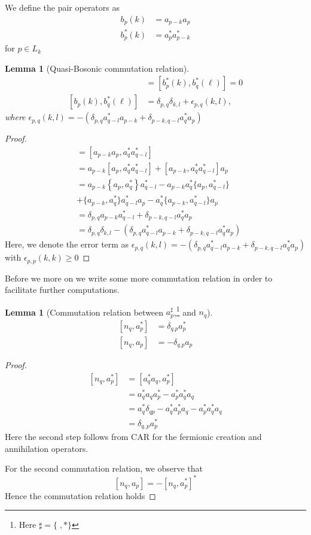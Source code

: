 \documentclass[sn-mathphys,Numbered, a4paper ,nocrop]{sn-jnl}%
\newcommand{\com}[1]{\left[ #1 \right]}
\theoremstyle{plain}
\newtheorem{lemma}[theorem]{Lemma}
\theoremstyle{definition}
\theoremstyle{remark}
\theoremstyle{plain}
\theoremstyle{definition}
\theoremstyle{remark}
\begin{document}
We define the pair operators as
\begin{align}
    b_p(k) &= a_{p-k}a_{p}\\
    b^*_p(k) &= a^*_{p}a^*_{p-k}
\end{align}
for $p\in L_k$
\begin{lemma}[Quasi-Bosonic commutation relation]
   \begin{align}
       [b_{p}(k),b_{q}(\ell)] &= [b^*_{p}(k),b^*_{q}(\ell)] = 0\\
       [b_{p}(k),b^*_{q}(\ell)] &= \delta_{p,q}\delta_{k,l} + \epsilon_{p,q}(k,l),
   \end{align} where $\epsilon_{p,q}(k,l) = -\left(\delta_{p,q}a^*_{q-l}a_{p-k} + \delta_{p-k,q-l}a^*_{q}a_{p}\right)$ 
    \end{lemma}
\begin{proof}
    \begin{align}
        [b_{p}(k),b^*_{q}(\ell)] &= [a_{p-k}a_{p},a^*_{q}a^*_{q-l}]\\
        &= a_{p-k}[a_p,a^*_{q}a^*_{q-l}] + [a_{p-k},a^*_{q}a^*_{q-l}]a_{p}\\
        &= a_{p-k}\left\{a_p,a^*_{q}\right\}a^*_{q-l} - a_{p-k}a^*_{q}\{a_{p},a^*_{q-l}\}\nonumber \\ &+ \{a_{p-k},a^*_q\}a^*_{q-l}a_{p} - a^*_{q}\{a_{p-k},a^*_{q-l}\}a_{p}\\
        &=\delta_{p,q}a_{p-k}a^*_{q-l} + \delta_{p-k,q-l}a^*_{q}a_{p}\\
        &= \delta_{p,q}\delta_{k,l}-\left(\delta_{p,q}a^*_{q-l}a_{p-k} + \delta_{p-k,q-l}a^*_{q}a_{p}\right)
    \end{align}
Here, we denote the error term as $\epsilon_{p,q}(k,l) = -\left(\delta_{p,q}a^*_{q-l}a_{p-k} + \delta_{p-k,q-l}a^*_{q}a_{p}\right)$ with $\epsilon_{p,p}(k,k)\geq 0$
\end{proof}
Before we more on we write some more commutation relation in order to facilitate further computations.
\begin{lemma}[Commutation relation between $a^\sharp_p$,\footnote{Here $\sharp = \{\;,*\} $} and $n_q$]
    \begin{align}
        \com{n_q,a^*_p} &= \delta_{q.p}a^*_p\\
        \com{n_q,a_p} &= -\delta_{q.p}a_p
    \end{align}
\end{lemma} 
\begin{proof}
    \begin{align}
        \com{n_q,a^*_p} &= \com{a^*_qa_q,a^*_p}\\
        &=a^*_qa_qa^*_p - a^*_pa^*_qa_q\\
        &= a^*_q\delta_{qp}- a^*_qa^*_pa_q - a^*_pa^*_qa_q\\
        &=\delta_{q,p}a^*_p
    \end{align}
    Here the second step follows from CAR for the fermionic creation and annihilation operators.
    
For the second commutation relation, we observe that 
    \begin{equation}
        \com{n_q,a_p}= -\com{n_q,a^*_p}^*
    \end{equation}
Hence the commutation relation holds
\end{proof}
\end{document}
